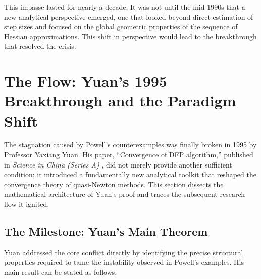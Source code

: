 \documentclass[12pt,a4paper]{article}  %
\newcounter{cite}
\theoremstyle{definition}
\numberwithin{equation}{section}
\begin{document}
This impasse lasted for nearly a decade. It was not until the mid-1990s that a new analytical perspective emerged, one that looked beyond direct estimation of step sizes and focused on the global geometric properties of the sequence of Hessian approximations. This shift in perspective would lead to the breakthrough that resolved the crisis.

\section{The Flow: Yuan's 1995 Breakthrough and the Paradigm Shift}
\label{sec:flow}

The stagnation caused by Powell's counterexamples \cite{powell1984,powell1986} was finally broken in 1995 by Professor Yaxiang Yuan. His paper, ``Convergence of DFP algorithm,'' published in \textit{Science in China (Series A)} \cite{yuan1995}, did not merely provide another sufficient condition; it introduced a fundamentally new analytical toolkit that reshaped the convergence theory of quasi-Newton methods. This section dissects the mathematical architecture of Yuan's proof and traces the subsequent research flow it ignited.

\subsection{The Milestone: Yuan's Main Theorem}
Yuan addressed the core conflict directly by identifying the precise structural properties required to tame the instability observed in Powell's examples. His main result can be stated as follows:
\end{document}
